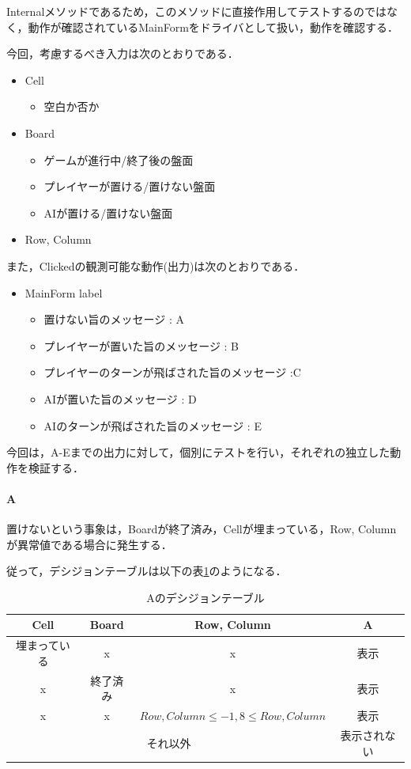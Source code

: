 \documentclass[platex,dvipdfmx,12pt]{jsarticle}
\begin{document}
Internalメソッドであるため，このメソッドに直接作用してテストするのではなく，動作が確認されているMainFormをドライバとして扱い，動作を確認する．

今回，考慮するべき入力は次のとおりである．

\begin{itemize}
  \item Cell \begin{itemize}
    \item 空白か否か
  \end{itemize}
  \item Board \begin{itemize}
    \item ゲームが進行中/終了後の盤面
    \item プレイヤーが置ける/置けない盤面
    \item AIが置ける/置けない盤面
  \end{itemize}
  \item Row, Column
\end{itemize}

また，Clickedの観測可能な動作(出力)は次のとおりである．

\begin{itemize}
  \item MainForm label \begin{itemize}
    \item 置けない旨のメッセージ : A
    \item プレイヤーが置いた旨のメッセージ : B
    \item プレイヤーのターンが飛ばされた旨のメッセージ :C
    \item AIが置いた旨のメッセージ : D
    \item AIのターンが飛ばされた旨のメッセージ : E
  \end{itemize}
\end{itemize}

今回は，A-Eまでの出力に対して，個別にテストを行い，それぞれの独立した動作を検証する．

\paragraph{A}
置けないという事象は，Boardが終了済み，Cellが埋まっている，Row, Columnが異常値である場合に発生する．

従って，デシジョンテーブルは以下の表\ref{tab:enshu6-a}のようになる．

\begin{table}[htbp]
  \centering
  \caption{Aのデシジョンテーブル}
  \label{tab:enshu6-a}
  \begin{tabular}{cccc}
    Cell & Board & Row, Column & A \\
    \hline
    埋まっている & x & x & 表示 \\
    x & 終了済み & x & 表示 \\
    x & x & $Row, Column \leq -1, 8 \leq Row, Column$ & 表示 \\
    \multicolumn{3}{c}{それ以外} & 表示されない \\
  \end{tabular}
\end{table}
\end{document}
